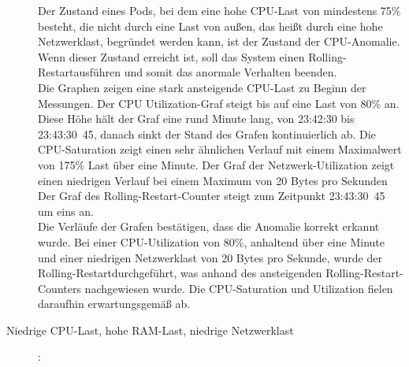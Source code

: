 \documentclass[a4paper,10pt]{scrartcl}
\begin{document}
\begin{description}
Der Zustand eines Pods, bei dem eine hohe CPU-Last von mindestens 75\% besteht, die nicht durch eine Last von außen, das heißt durch eine hohe Netzwerklast, begründet werden kann, ist der Zustand der CPU-Anomalie. Wenn dieser Zustand erreicht ist, soll das System einen \glqq Rolling-Restart\grqq ausführen und somit das anormale Verhalten beenden.\\
Die Graphen zeigen eine stark ansteigende CPU-Last zu Beginn der Messungen. Der CPU Utilization-Graf steigt bis auf eine Last von 80\% an. Diese Höhe hält der Graf eine rund Minute lang, von 23:42:30 bis 23:43:30~45, danach sinkt der Stand des Grafen kontinuierlich ab. Die CPU-Saturation zeigt einen sehr ähnlichen Verlauf mit einem Maximalwert von 175\% Last über eine Minute. Der Graf der Netzwerk-Utilization zeigt einen niedrigen Verlauf bei einem Maximum von 20 Bytes pro Sekunden\\
Der Graf des \glqq Rolling-Restart\grqq -Counter steigt zum Zeitpunkt 23:43:30~45 um eins an.\\
Die Verläufe der Grafen bestätigen, dass die Anomalie korrekt erkannt wurde. Bei einer CPU-Utilization von 80\%, anhaltend über eine Minute und einer niedrigen Netzwerklast von 20 Bytes pro Sekunde, wurde der \glqq Rolling-Restart\grqq durchgeführt, was anhand des ansteigenden \glqq Rolling-Restart\grqq -Counters nachgewiesen wurde. Die CPU-Saturation und Utilization fielen daraufhin erwartungsgemäß ab.

\pagebreak

\item[Niedrige CPU-Last, hohe RAM-Last, niedrige Netzwerklast]:\\


\end{description}
\end{document}
